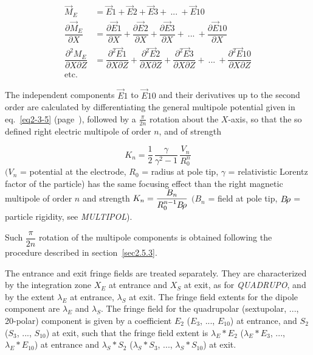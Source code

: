 \begin{align*}
	\vec  M_E & = \vec  E1 + \vec  E2 + \vec  E3 + ~...~ + \vec  E10 \\
	\dfrac{ \partial\vec  M_E }{ \partial X}  
	          & =  \dfrac{ \partial\vec  E1 }{ \partial X} +
	               \dfrac{\partial\vec  E2 }{ \partial X} + 
	               \dfrac{\partial\vec  E3 }{ \partial X} +
	                         ~...~ +
	               \dfrac{\partial\vec  E10 }{ \partial X}  \\
	\dfrac{ \partial^ 2M_E}{ \partial X\partial Z} 
	          &   = \dfrac{\partial^ 2\vec  E1 }{ \partial X\partial Z} +
	               \dfrac{\partial^ 2\vec  E2 }{\partial X\partial Z} + 
	               \dfrac{\partial^ 2\vec  E3 }{ \partial X\partial Z} +
                                 ~...~ +
	               \dfrac{\partial^ 2\vec  E10 }{ \partial X\partial Z}  \\
	   \text{etc.} &
\end{align*}

\noindent The independent components $ \vec  E1 $ to $ \vec  E10 $ and their
derivatives up to the second order are calculated by differentiating the general multipole potential 
 given  in eq.~\ref{eq2-3-5} (page~\pageref{eq2-3-5}), followed by 
  a $ \frac{\pi }{ 2n} $ rotation about the $ X$-axis, so
that the so defined right electric multipole of order $ n$,  and of 
strength~\cite{Biblio14, Biblio15}   %

$$ K_n = \dfrac{1 }{ 2}\, \dfrac{\gamma }{ \gamma^ 2-1}\, \dfrac{V_ n }{ R^n_0} $$
%
$ (V_ n $ = potential at the electrode, $ R_0 $ = radius at pole tip, 
$\gamma$  = relativistic Lorentz factor of the particle) has the same focusing effect 
than the right magnetic multipole of order $ n $ and strength
 $ K_n= \dfrac{B_n }{ R^{n-1}_0 B\!\rho} $ 
$ (B_n $ = field at pole tip, $ B\!\rho $ = particle rigidity, see \textsl{MULTIPOL}). 

\noindent Such $ \dfrac{\pi }{ 2n} $ rotation of the multipole components is
obtained following the procedure described in section~\ref{sec2.5.3}.  
\bigskip

\noindent The entrance and exit fringe fields are treated separately.  They
are characterized by the integration zone $ X_E $ at entrance and $ X_S $ at exit,
as for \textsl{QUADRUPO}, and by the extent $ \lambda_ E $ at entrance, $\lambda_ S $ 
at exit. The fringe field extents for the dipole component are $ \lambda_ E $
and $ \lambda_ S $. The fringe field for the quadrupolar (sextupolar,  ..., 
 20-polar) component is given by a coefficient $ E_2 $ 
 ($E_3$, ..., $E_{10}$)   at entrance, and $ S_2 $ ($ S_3$, ..., $S_{10}$)   at exit, 
 such that the fringe field extent is $ \lambda_ E\ast E_2$  
 ($\lambda_ E\ast E_3$, ..., $\lambda_ E\ast E_{10}$)  at 
entrance and $ \lambda_ S\ast S_2 $  ($\lambda_ S\ast S_3$, ..., $\lambda_ S\ast S_{10}$) 
 at exit.  
\bigskip

